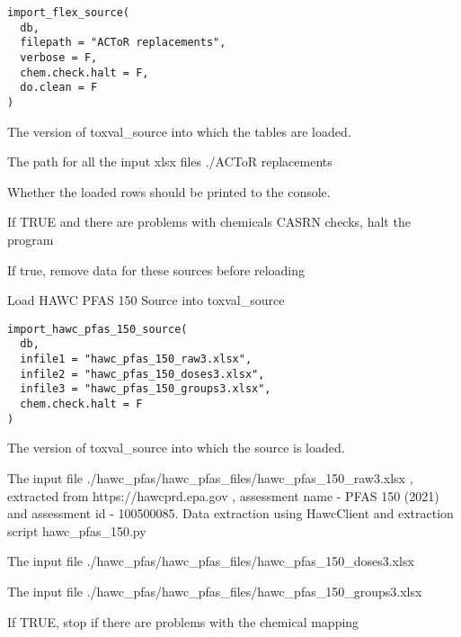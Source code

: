 \documentclass[letterpaper]{book}
\begin{document}
%
\begin{Usage}
\begin{verbatim}
import_flex_source(
  db,
  filepath = "ACToR replacements",
  verbose = F,
  chem.check.halt = F,
  do.clean = F
)
\end{verbatim}
\end{Usage}
%
\begin{Arguments}
\begin{ldescription}
\item[\code{db}] The version of toxval\_source into which the tables are loaded.

\item[\code{filepath}] The path for all the input xlsx files ./ACToR replacements

\item[\code{verbose}] Whether the loaded rows should be printed to the console.

\item[\code{chem.check.halt}] If TRUE and there are problems with chemicals CASRN checks, halt the program

\item[\code{do.clean}] If true, remove data for these sources before reloading
\end{ldescription}
\end{Arguments}
%
\begin{Description}\relax
Load HAWC PFAS 150 Source into toxval\_source
\end{Description}
%
\begin{Usage}
\begin{verbatim}
import_hawc_pfas_150_source(
  db,
  infile1 = "hawc_pfas_150_raw3.xlsx",
  infile2 = "hawc_pfas_150_doses3.xlsx",
  infile3 = "hawc_pfas_150_groups3.xlsx",
  chem.check.halt = F
)
\end{verbatim}
\end{Usage}
%
\begin{Arguments}
\begin{ldescription}
\item[\code{db}] The version of toxval\_source into which the source is loaded.

\item[\code{infile1}] The input file ./hawc\_pfas/hawc\_pfas\_files/hawc\_pfas\_150\_raw3.xlsx , extracted
from https://hawcprd.epa.gov , assessment name - PFAS 150 (2021) and assessment id - 100500085.
Data extraction using HawcClient and extraction script hawc\_pfas\_150.py

\item[\code{infile2}] The input file ./hawc\_pfas/hawc\_pfas\_files/hawc\_pfas\_150\_doses3.xlsx

\item[\code{infile3}] The input file ./hawc\_pfas/hawc\_pfas\_files/hawc\_pfas\_150\_groups3.xlsx

\item[\code{chem.check.halt}] If TRUE, stop if there are problems with the chemical mapping
\end{ldescription}
\end{Arguments}
\end{document}

